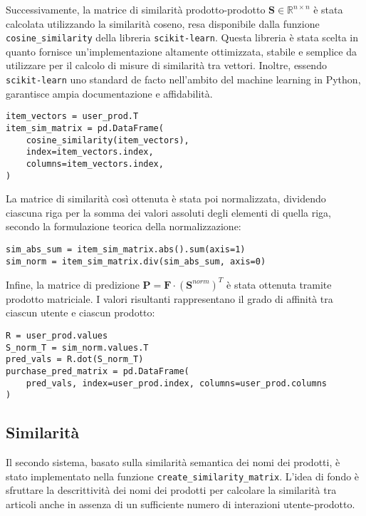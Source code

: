 Successivamente, la matrice di similarità prodotto-prodotto $\mathbf{S} \in \mathbb{R}^{n \times n}$ è stata calcolata utilizzando la similarità coseno, resa disponibile dalla funzione \texttt{cosine\_similarity} della libreria \texttt{scikit-learn}. Questa libreria è stata scelta in quanto fornisce un'implementazione altamente ottimizzata, stabile e semplice da utilizzare per il calcolo di misure di similarità tra vettori. Inoltre, essendo \texttt{scikit-learn} uno standard de facto nell'ambito del machine learning in Python, garantisce ampia documentazione e affidabilità.

\begin{lstlisting}
item_vectors = user_prod.T
item_sim_matrix = pd.DataFrame(
    cosine_similarity(item_vectors),
    index=item_vectors.index,
    columns=item_vectors.index,
)
\end{lstlisting}

La matrice di similarità così ottenuta è stata poi normalizzata, dividendo ciascuna riga per la somma dei valori assoluti degli elementi di quella riga, secondo la formulazione teorica della normalizzazione:

\begin{lstlisting}
sim_abs_sum = item_sim_matrix.abs().sum(axis=1)
sim_norm = item_sim_matrix.div(sim_abs_sum, axis=0)
\end{lstlisting}

Infine, la matrice di predizione $\mathbf{P} = \mathbf{F} \cdot (\mathbf{S}^{norm})^T$ è stata ottenuta tramite prodotto matriciale. I valori risultanti rappresentano il grado di affinità tra ciascun utente e ciascun prodotto:

\begin{lstlisting}
R = user_prod.values
S_norm_T = sim_norm.values.T
pred_vals = R.dot(S_norm_T)
purchase_pred_matrix = pd.DataFrame(
    pred_vals, index=user_prod.index, columns=user_prod.columns
)
\end{lstlisting}

\subsection{Similarità}

Il secondo sistema, basato sulla similarità semantica dei nomi dei prodotti, è stato implementato nella funzione \texttt{create\_similarity\_matrix}. L'idea di fondo è sfruttare la descrittività dei nomi dei prodotti per calcolare la similarità tra articoli anche in assenza di un sufficiente numero di interazioni utente-prodotto.

